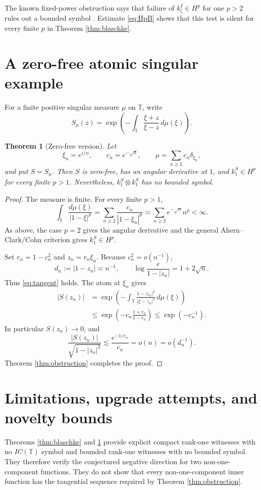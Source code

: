 \documentclass[11pt]{article}
\newtheorem{theorem}{Theorem}
\newcommand{\T}{\mathbb T}
\begin{document}
The known fixed-power obstruction says that failure of
$k_\zeta^I\in H^p$ for one $p>2$ rules out a bounded symbol
\cite[Theorem 5.3]{BCFMT}.  Estimate \eqref{eq:HpB} shows that this test is
silent for every finite $p$ in Theorem \ref{thm:blaschke}.

\section{A zero-free atomic singular example}

For a finite positive singular measure $\mu$ on $\T$, write
\[
 S_\mu(z)=\exp\left(-\int_\T\frac{\xi+z}{\xi-z}\,d\mu(\xi)\right).
\]

\begin{theorem}[Zero-free version]
\label{thm:singular}
Let
\[
 \xi_n=e^{i/n},\qquad c_n=e^{-\sqrt n},\qquad
 \mu=\sum_{n\ge2}c_n\delta_{\xi_n},
\]
and put $S=S_\mu$.  Then $S$ is zero-free, has an angular derivative at
$1$, and $k_1^S\in H^p$ for every finite $p>1$.  Nevertheless,
$k_1^S\otimes k_1^S$ has no bounded symbol.
\end{theorem}

\begin{proof}
The measure is finite.  For every finite $p>1$,
\[
 \int_\T\frac{d\mu(\xi)}{|1-\xi|^p}
 =\sum_{n\ge2}\frac{c_n}{|1-\xi_n|^p}
 \asymp\sum_{n\ge2}e^{-\sqrt n}n^p<\infty.
\]
As above, the case $p=2$ gives the angular derivative and the general
Ahern--Clark/Cohn criterion gives $k_1^S\in H^p$.

Set $r_n=1-c_n^2$ and $z_n=r_n\xi_n$.  Because $c_n^2=o(n^{-1})$,
\[
 d_n:=|1-z_n|\asymp n^{-1},\qquad
 \log\frac{e}{1-|z_n|}=1+2\sqrt n.
\]
Thus \eqref{eq:tangent} holds.  The atom at $\xi_n$ gives
\begin{align*}
 |S(z_n)|
 &=\exp\left(-\int_\T
       \frac{1-|z_n|^2}{|\xi-z_n|^2}\,d\mu(\xi)\right)\\
 &\le \exp\left(-c_n\frac{1+r_n}{1-r_n}\right)
 \le \exp(-c_n^{-1}).
\end{align*}
In particular $S(z_n)\to0$, and
\[
 \frac{|S(z_n)|}{\sqrt{1-|z_n|^2}}
 \lesssim \frac{e^{-1/c_n}}{c_n}=o(n)=o(d_n^{-1}).
\]
Theorem \ref{thm:obstruction} completes the proof.
\end{proof}

\section{Limitations, upgrade attempts, and novelty bounds}

Theorems \ref{thm:blaschke} and \ref{thm:singular} provide explicit compact
rank-one witnesses with no $I C(\T)$ symbol and bounded rank-one witnesses
with no bounded symbol.  They therefore verify the conjectured negative
direction for two non-one-component functions.  They do not show that every
non-one-component inner function has the tangential sequence required by
Theorem \ref{thm:obstruction}.
\end{document}

